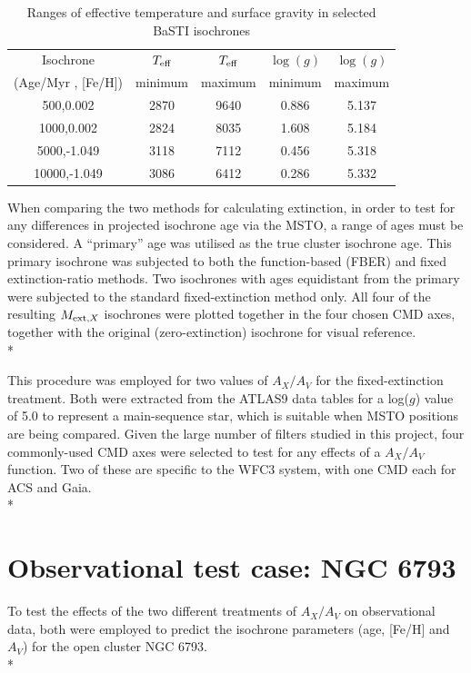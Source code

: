 \documentclass[12pt, a4paper]{report}
\begin{document}
\begin{table}
\begin{center}
\begin{tabular}{ccccc}
\hline
Isochrone & $T_{\textnormal{eff}}$ & $T_{\textnormal{eff}}$ & $\log(g)$ & $\log(g)$ \\
(Age/Myr , [Fe/H]) & minimum & maximum & minimum & maximum \\
\hline
500,0.002 & 2870 & 9640 & 0.886 & 5.137 \\
1000,0.002 & 2824 & 8035 & 1.608 & 5.184 \\
5000,-1.049 & 3118 & 7112 & 0.456 & 5.318 \\
10000,-1.049 & 3086 & 6412 & 0.286 & 5.332 \\
\hline
\end{tabular}
\caption{Ranges of effective temperature and surface gravity in selected BaSTI isochrones}
\label{variable_ranges}
\end{center}
\end{table}

When comparing the two methods for calculating extinction, in order to test for any differences in projected isochrone age via the MSTO, a range of ages must be considered. A ``primary'' age was utilised as the true cluster isochrone age. This primary isochrone was subjected to both the function-based (FBER) and fixed extinction-ratio methods. Two isochrones with ages equidistant from the primary were subjected to the standard fixed-extinction method only. All four of the resulting $M_{\textnormal{ext},X}$ isochrones were plotted together in the four chosen CMD axes, together with the original (zero-extinction) isochrone for visual reference.\\*

This procedure was employed for two values of $A_{X}/A_{V}$ for the fixed-extinction treatment. Both were extracted from the ATLAS9 data tables for a log($g$) value of 5.0 to represent a main-sequence star, which is suitable when MSTO positions are being compared. Given the large number of filters studied in this project, four commonly-used CMD axes were selected to test for any effects of a $A_{X}/A_{V}$ function. Two of these are specific to the WFC3 system, with one CMD each for ACS and Gaia.\\*

\section{Observational test case: NGC 6793} \label{obs_ngc_section}
To test the effects of the two different treatments of $A_{X}/A_{V}$ on observational data, both were employed to predict the isochrone parameters (age, [Fe/H] and $A_{V}$) for the open cluster NGC 6793.\\*
\end{document}
